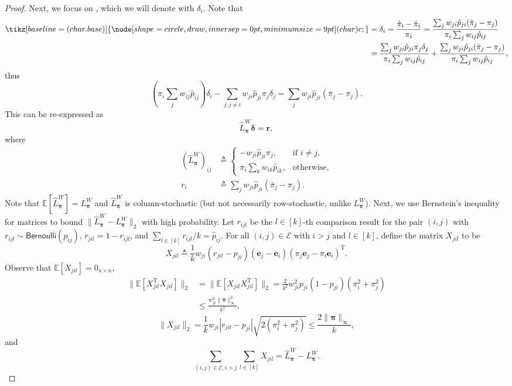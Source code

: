 \documentclass[sigconf,nonacm,pbalance]{acmart}
\newcommand{\tran}{{\mathrm{T}}}
\newcommand{\circled}[1]{
    \tikz[baseline=(char.base)]{\node[shape=circle, draw, inner sep=0pt,minimum size=9pt] (char) {#1};}
}
\begin{document}
\begin{proof}
Next, we focus on \circled{c}, which we will denote with $\delta_i$. Note that
\begin{align}
\circled{c} &= \delta_i = \frac{\hat{\pi}_i-\bar{\pi}_i}{\pi_i} = \frac{\sum_j w_{ji} \hat{p}_{ji} (\hat{\pi}_j-\pi_j)}{\pi_i\sum_j w_{ij}\hat{p}_{ij}} \\
&= \frac{\sum_j w_{ji} \hat{p}_{ji} \pi_j \delta_j}{\pi_i\sum_j w_{ij}\hat{p}_{ij} } + \frac{\sum_j w_{ji} \hat{p}_{ji} (\bar{\pi}_j-\pi_j)}{\pi_i \sum_j w_{ij} \hat{p}_{ij}},
\end{align}
thus
\begin{equation}
(\pi_i \sum_j w_{ij} \hat{p}_{ij})\delta_i - \sum_{j:j\neq i} w_{ji}\hat{p}_{ji}\pi_j \delta_j = \sum_j w_{ji} \hat{p}_{ji} (\bar{\pi}_j-\pi_j).
\end{equation}
This can be re-expressed as
\begin{equation}
\hat{L}_{\bm{\pi}}^W \bm{\delta} = \bm{r}, \label{eq:weighted-Ld-r}
\end{equation}
where
\begin{align}
(\hat{L}_{\bm{\pi}}^W)_{ij} &\triangleq \begin{cases}
    -w_{ji}\hat{p}_{ji}\pi_j, & \text{if } i \neq j, \\
    \pi_i \sum_k w_{ik} \hat{p}_{ik}, & \text{otherwise},
\end{cases} \\
r_i &\triangleq \sum_j w_{ji} \hat{p}_{ji} (\bar{\pi}_j-\pi_j).
\end{align}
Note that $\mathbb{E}[\hat{L}_{\bm{\pi}}^W] = L_{\bm{\pi}}^W$ and $\hat{L}_{\bm{\pi}}^W$ is column-stochastic (but not necessarily row-stochastic, unlike $L_{\bm{\pi}}^W$). Next, we use Bernstein's inequality for matrices \cite{Tropp2015} to bound $\|\hat{L}_{\bm{\pi}}^W-L_{\bm{\pi}}^W\|_2$ with high probability. Let $r_{ijl}$ be the $l\in[k]$-th comparison result for the pair $(i, j)$ with $r_{ijl} \sim \mathsf{Bernoulli}(p_{ij})$, $r_{jil}=1-r_{ijl}$, and $\sum_{l\in[k]} r_{ijl}/k = \hat{p}_{ij}$. For all $(i, j) \in \mathcal{E}$ with $i>j$ and $l\in[k]$, define the matrix $X_{jil}$ to be
\begin{equation}
X_{jil} \triangleq \frac{1}{k} w_{ji} (r_{jil}-p_{ji}) (\bm{e}_j-\bm{e}_i) (\pi_j \bm{e}_j-\pi_i \bm{e}_i)^\tran.
\end{equation}
Observe that $\mathbb{E}[X_{jil}]=0_{n\times n}$,
\begin{align}
\|\mathbb{E} [X_{jil}^\tran X_{jil}]\|_2 &= \|\mathbb{E} [X_{jil} X_{jil}^\tran]\|_2 = \frac{2}{k^2} w_{ji}^2 p_{ji}(1-p_{ji}) (\pi_i^2+\pi_j^2) \\
&\leq \frac{w_{ji}^2\|\bm{\pi}\|_\infty^2}{k^2},
\end{align}
\begin{equation}
\|X_{jil}\|_2 = \frac{1}{k}w_{ji}|r_{jil}-p_{ji}| \sqrt{2(\pi_i^2+\pi_j^2)} \leq \frac{2 \|\bm{\pi}\|_\infty}{k},
\end{equation}
and
\begin{equation}
\sum_{(i, j)\in\mathcal{E},i>j} \sum_{l\in[k]} X_{jil} = \hat{L}_{\bm{\pi}}^W-L_{\bm{\pi}}^W.
\end{equation}


\end{proof}
\end{document}
